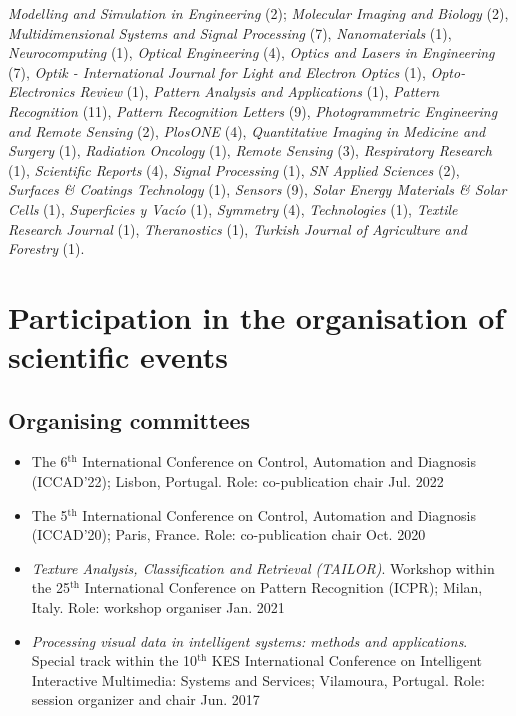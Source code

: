 \documentclass[11pt]{article}
\begin{document}
\begin{itemize}
		\emph{Modelling and Simulation in Engineering} (2);
    \emph{Molecular Imaging and Biology} (2),
    \emph{Multidimensional Systems and Signal Processing} (7),
    \emph{Nanomaterials} (1),
    \emph{Neurocomputing} (1),
    \emph{Optical Engineering} (4),
    \emph{Optics and Lasers in Engineering} (7),
    \emph{Optik - International Journal for Light and Electron Optics} (1),
    \emph{Opto-Electronics Review} (1),
    \emph{Pattern Analysis and Applications} (1),
    \emph{Pattern Recognition} (11),
    \emph{Pattern Recognition Letters} (9),
    \emph{Photogrammetric Engineering and Remote Sensing} (2),
    \emph{PlosONE} (4),
		\emph{Quantitative Imaging in Medicine and Surgery} (1),
    \emph{Radiation Oncology} (1),
    \emph{Remote Sensing} (3),
    \emph{Respiratory Research} (1),
    \emph{Scientific Reports} (4),
    \emph{Signal Processing} (1),
    \emph{SN Applied Sciences} (2),
    \emph{Surfaces \& Coatings Technology} (1),
    \emph{Sensors} (9),
    \emph{Solar Energy Materials \& Solar Cells} (1),
    \emph{Superficies y Vacío} (1),
    \emph{Symmetry} (4),
		\emph{Technologies} (1),
    \emph{Textile Research Journal} (1),
    \emph{Theranostics} (1),
    \emph{Turkish Journal of Agriculture and Forestry} (1).
\end{itemize}

\section*{Participation in the organisation of scientific events}

\subsection*{Organising committees}

\begin{itemize} 

	\item The 6$^\text{th}$ International Conference on Control, Automation and Diagnosis (ICCAD'22); Lisbon, Portugal. Role: co-publication chair \hfill Jul. 2022

	\item The 5$^\text{th}$ International Conference on Control, Automation and Diagnosis (ICCAD'20); Paris, France. Role: co-publication chair \hfill Oct. 2020 

	\item \emph{Texture Analysis, Classification and Retrieval (TAILOR)}. Workshop within the 25$^\text{th}$ International Conference on Pattern Recognition (ICPR); Milan, Italy. Role: workshop organiser \hfill Jan. 2021

	\item \emph{Processing visual data in intelligent systems: methods and applications}. Special track within the 10$^\text{th}$ KES International Conference on Intelligent Interactive Multimedia: Systems and Services; Vilamoura, Portugal. Role: session organizer and chair \hfill Jun. 2017

\end{itemize}	
\end{document}

